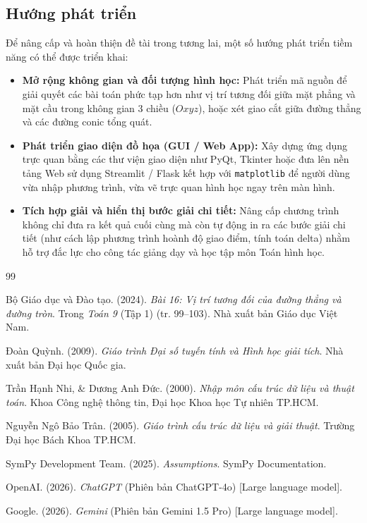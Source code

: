 \documentclass[12pt,a4paper]{article}
\begin{document}
\subsection{Hướng phát triển}

Để nâng cấp và hoàn thiện đề tài trong tương lai, một số hướng phát triển tiềm năng có thể được triển khai:

\begin{itemize}
    \item \textbf{Mở rộng không gian và đối tượng hình học:} Phát triển mã nguồn để giải quyết các bài toán phức tạp hơn như vị trí tương đối giữa mặt phẳng và mặt cầu trong không gian 3 chiều ($Oxyz$), hoặc xét giao cắt giữa đường thẳng và các đường conic tổng quát.
    \item \textbf{Phát triển giao diện đồ họa (GUI / Web App):} Xây dựng ứng dụng trực quan bằng các thư viện giao diện như PyQt, Tkinter hoặc đưa lên nền tảng Web sử dụng Streamlit / Flask kết hợp với \texttt{matplotlib} để người dùng vừa nhập phương trình, vừa vẽ trực quan hình học ngay trên màn hình.
    \item \textbf{Tích hợp giải và hiển thị bước giải chi tiết:} Nâng cấp chương trình không chỉ đưa ra kết quả cuối cùng mà còn tự động in ra các bước giải chi tiết (như cách lập phương trình hoành độ giao điểm, tính toán delta) nhằm hỗ trợ đắc lực cho công tác giảng dạy và học tập môn Toán hình học.
\end{itemize}
\pagebreak

\begin{thebibliography}{99}

Bộ Giáo dục và Đào tạo. (2024). \emph{Bài 16: Vị trí tương đối của đường thẳng và đường tròn}. Trong \emph{Toán 9} (Tập 1) (tr. 99–103). Nhà xuất bản Giáo dục Việt Nam.


Đoàn Quỳnh. (2009). \emph{Giáo trình Đại số tuyến tính và Hình học giải tích}. Nhà xuất bản Đại học Quốc gia.

Trần Hạnh Nhi, \& Dương Anh Đức. (2000). \emph{Nhập môn cấu trúc dữ liệu và thuật toán}. Khoa Công nghệ thông tin, Đại học Khoa học Tự nhiên TP.HCM.

Nguyễn Ngô Bảo Trân. (2005). \emph{Giáo trình cấu trúc dữ liệu và giải thuật}. Trường Đại học Bách Khoa TP.HCM.


SymPy Development Team. (2025). \emph{Assumptions}. SymPy Documentation.

OpenAI. (2026). \emph{ChatGPT} (Phiên bản ChatGPT-4o) [Large language model].

Google. (2026). \emph{Gemini} (Phiên bản Gemini 1.5 Pro) [Large language model].

\end{thebibliography}
\end{document}
